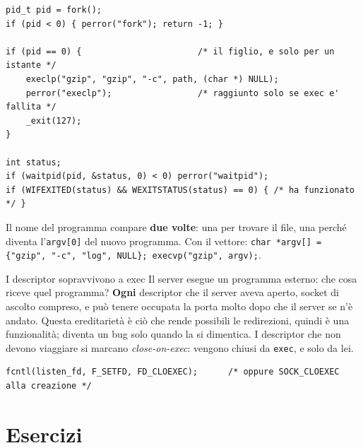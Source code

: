 \begin{lstlisting}[language={[POSIX]C}, style=wnumbers, title={fork, exec, wait}]
pid_t pid = fork();
if (pid < 0) { perror("fork"); return -1; }

if (pid == 0) {                       /* il figlio, e solo per un istante */
    execlp("gzip", "gzip", "-c", path, (char *) NULL);
    perror("execlp");                 /* raggiunto solo se exec e' fallita */
    _exit(127);
}

int status;
if (waitpid(pid, &status, 0) < 0) perror("waitpid");
if (WIFEXITED(status) && WEXITSTATUS(status) == 0) { /* ha funzionato */ }
\end{lstlisting}

Il nome del programma compare \textbf{due volte}: una per trovare il file, una perché diventa l'\texttt{argv[0]} del nuovo
programma. Con il vettore: \texttt{char *argv[] = \{"gzip", "-c", "log", NULL\}; execvp("gzip", argv);}.

\begin{warningbox}{{I descriptor sopravvivono a exec}}
    Il server esegue un programma esterno: che cosa riceve quel programma? \textbf{Ogni} descriptor che il server aveva
    aperto, socket di ascolto compreso, e può tenere occupata la porta molto dopo che il server se n'è andato. Questa
    ereditarietà è ciò che rende possibili le redirezioni, quindi è una funzionalità; diventa un bug solo quando la si
    dimentica. I descriptor che non devono viaggiare si marcano \emph{close-on-exec}: vengono chiusi da \texttt{exec}, e solo
    da lei.
\begin{lstlisting}[language={[POSIX]C}]
fcntl(listen_fd, F_SETFD, FD_CLOEXEC);      /* oppure SOCK_CLOEXEC alla creazione */
\end{lstlisting}
\end{warningbox}

\section{Esercizi}

